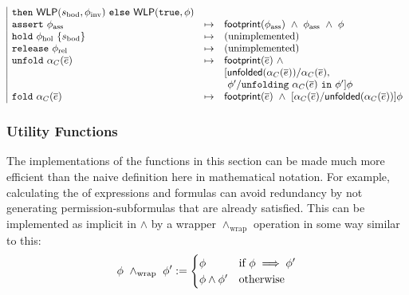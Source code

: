 \begin{spacing}{1.75}
\begin{align*}
\begin{array}{|lcl}
    \code{then} \ \WLP(s_\text{bod}, \phi_\text{inv}) \
    \code{else} \ \WLP(\code{true}, \phi)
\\
\code{assert} \ \phi_\text{ass} &\mapsto&
  \tsf{footprint}(\phi_\text{ass}) \ \land \
  \phi_\text{ass} \ \land \
  \phi
\\
\code{hold} \ \phi_\text{hol} \ \{ s_\text{bod} \} &\mapsto&
  \text{(unimplemented)} %
\\
\code{release} \ \phi_\text{rel} &\mapsto&
  \text{(unimplemented)} %
\\
\code{unfold} \ \alpha_C(\overline{e}) &\mapsto&
  \tsf{footprint}(\overline{e}) \ \land \\ &&
  [ \tsf{unfolded}(\alpha_C(\overline{e})) / \alpha_C(\overline{e}), \\ && \
    \phi\p / \code{unfolding} \ \alpha_C(\overline{e}) \ \code{in} \ \phi\p ]
  \phi
\\
\code{fold} \ \alpha_C(\overline{e}) &\mapsto&
  \tsf{footprint}(\overline{e}) \ \land \
  [ \alpha_C(\overline{e}) / \tsf{unfolded}(\alpha_C(\overline{e})) ] \phi
%
\end{array}
\end{align*}
\end{spacing}

\newpage
\subsubsection{Utility Functions}

\noindent
The implementations of the functions in this section can be made much more efficient than the naive definition here in mathematical notation. For example, calculating the  of expressions and formulas can avoid redundancy by not generating permission-subformulas that are already satisfied. This can be implemented as implicit in $\land$ by a wrapper $\land_\text{wrap}$ operation in some way similar to this:
\begin{align*}
  \phi \ \land_\text{wrap} \ \phi^\prime := \begin{cases}
    \phi & \text{if} \ \phi \implies \phi^\prime \\
    \phi \land \phi^\prime & \text{otherwise}
  \end{cases}
\end{align*}

